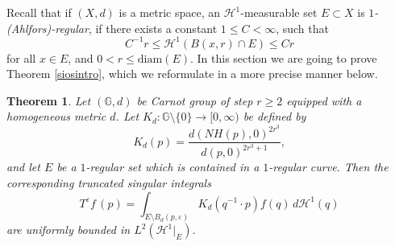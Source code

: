 \documentclass[11pt]{amsart}
\newtheorem{theorem}{Theorem}
\theoremstyle{definition}
\newcommand{\G}{\mathbb G}
\newcommand{\ra}{\rightarrow}
\newcommand{\ha}{\mathcal{H}}
\newcommand{\stm}{\setminus}
\newcommand{\ve}{\varepsilon}
\numberwithin{theorem}{section} \numberwithin{equation}{section}
\begin{document}
Recall that if $(X,d)$ is a metric space, an $\ha^{1}$-measurable set $E \subset X$ is \emph{
$1$-(Ahlfors)-regular}, if there exists a constant $1\leq C
<\infty$, such that
\begin{displaymath}
C^{-1} r \leq \mathcal{H}^1(B(x,r)\cap E) \leq C r
\end{displaymath}
for all  $x\in E$, and $0<r\leq \mathrm{diam}(E)$. In this section we are going to prove Theorem \ref{siosintro}, which we reformulate in a more precise manner below.
\begin{theorem}
\label{sios}
Let $(\G,d)$ be Carnot group of step $r\geq 2$ equipped with a homogeneous metric $d$. Let $K_d : \G \stm \{0\} \ra [0,\infty)$ be defined by
$$K_d(p)=\frac{d(NH(p),0)^{2r^3}}{d(p,0)^{2r^3+1}},$$
and let $E$ be a $1$-regular set which is contained in a $1$-regular curve.  Then the corresponding truncated singular integrals
$$T^\ve f\,(p)=\int_{E \stm B_{d}(p,\ve)} K_d(q^{-1} \cdot p) f(q) \,d \ha^1(q)$$
are uniformly bounded in $L^2(\ha^1 |_E)$.
\end{theorem}
\end{document}
